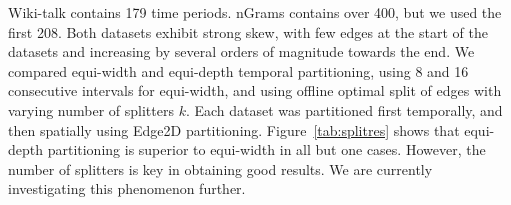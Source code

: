 Wiki-talk contains 179 time periods.  nGrams contains over 400, but we
used the first 208.  Both datasets exhibit strong skew, with few edges
at the start of the datasets and increasing by several orders of
magnitude towards the end.  We compared equi-width and equi-depth
temporal partitioning, using 8 and 16 consecutive intervals for
equi-width, and using offline optimal split of edges with varying
number of splitters $k$.  Each dataset was partitioned first
temporally, and then spatially using Edge2D partitioning.
Figure~\ref{tab:splitres} shows that equi-depth partitioning is
superior to equi-width in all but one cases.  However, the number of
splitters is key in obtaining good results.  We are currently
investigating this phenomenon further.

